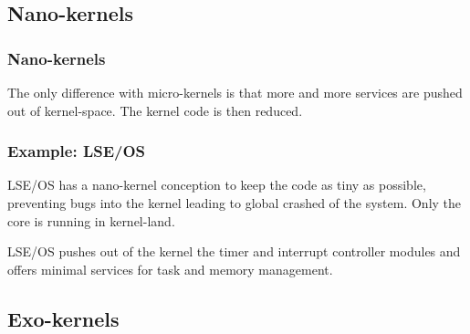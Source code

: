 %
%

\subsection{Nano-kernels}

%
%

\begin{frame}
  \frametitle{Nano-kernels}

  The only difference with micro-kernels is that more and more services are pushed out of kernel-space. The kernel code is then reduced.

\end{frame}

%
%

\begin{frame}
  \frametitle{Example: LSE/OS}

  LSE/OS has a nano-kernel conception to keep the code as tiny as possible, preventing bugs into the kernel leading to global crashed of the system. Only the core is running in kernel-land.

  \begin{center}
  \end{center}

  LSE/OS pushes out of the kernel the timer and interrupt controller modules and offers minimal services for task and memory management.

\end{frame}

%
%

\subsection{Exo-kernels}

%
%

